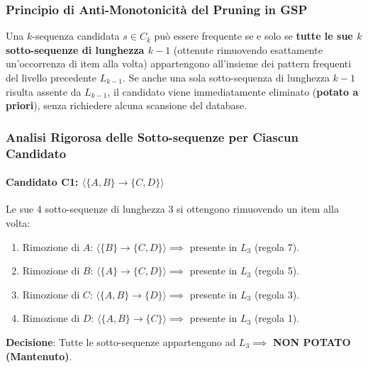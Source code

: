 \FloatBarrier
\subsubsection{Principio di Anti-Monotonicità del Pruning in GSP}
\begin{theorem}
\label{thm:dm-gsp-pruning}
Una $k$-sequenza candidata $s \in C_k$ può essere frequente se e solo se \textbf{tutte le sue $k$ sotto-sequenze di lunghezza $k-1$} (ottenute rimuovendo esattamente un'occorrenza di item alla volta) appartengono all'insieme dei pattern frequenti del livello precedente $L_{k-1}$. Se anche una sola sotto-sequenza di lunghezza $k-1$ risulta assente da $L_{k-1}$, il candidato viene immediatamente eliminato (\textbf{potato a priori}), senza richiedere alcuna scansione del database.
\end{theorem}

\FloatBarrier
\subsubsection{Analisi Rigorosa delle Sotto-sequenze per Ciascun Candidato}

\paragraph{Candidato C1: \texorpdfstring{$\langle \{A, B\} \to \{C, D\} \rangle$}{C1}}
Le sue 4 sotto-sequenze di lunghezza 3 si ottengono rimuovendo un item alla volta:
\begin{enumerate}
    \item Rimozione di $A$: $\langle \{B\} \to \{C, D\} \rangle \implies$ presente in $L_3$ (regola 7).
    \item Rimozione di $B$: $\langle \{A\} \to \{C, D\} \rangle \implies$ presente in $L_3$ (regola 5).
    \item Rimozione di $C$: $\langle \{A, B\} \to \{D\} \rangle \implies$ presente in $L_3$ (regola 3).
    \item Rimozione di $D$: $\langle \{A, B\} \to \{C\} \rangle \implies$ presente in $L_3$ (regola 1).
\end{enumerate}
\textbf{Decisione}: Tutte le sotto-sequenze appartengono ad $L_3 \implies$ \textbf{NON POTATO (Mantenuto)}.

